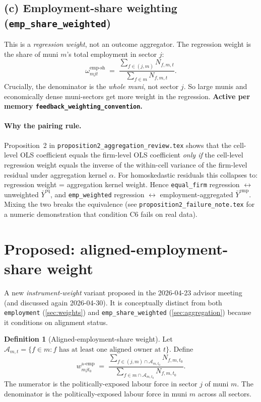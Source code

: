 \documentclass[12pt]{article}
\theoremstyle{definition}
\newtheorem{definition}{Definition}
\begin{document}
\subsection*{(c) Employment-share weighting (\texttt{emp\_share\_weighted})}
This is a \emph{regression weight}, not an outcome aggregator. The regression weight is the share of muni $m$'s total employment in sector $j$:
\[
  \omega^{\text{emp-sh}}_{m j t} \;=\; \frac{\sum_{f \in (j,m)} N_{f,m,t}}{\sum_{f \in m} N_{f,m,t}}.
\]
Crucially, the denominator is the \emph{whole muni}, not sector $j$. So large munis and economically dense muni-sectors get more weight in the regression. \textbf{Active per memory \texttt{feedback\_weighting\_convention}.}

\paragraph{Why the pairing rule.}
Proposition~2 in \texttt{proposition2\_aggregation\_review.tex} shows that the cell-level OLS coefficient equals the firm-level OLS coefficient \emph{only if} the cell-level regression weight equals the inverse of the within-cell variance of the firm-level residual under aggregation kernel $\alpha$. For homoskedastic residuals this collapses to: regression weight = aggregation kernel weight. Hence \texttt{equal\_firm} regression $\leftrightarrow$ unweighted $\bar Y^{\text{eq}}$, and \texttt{emp\_weighted} regression $\leftrightarrow$ employment-aggregated $\bar Y^{\text{emp}}$. Mixing the two breaks the equivalence (see \texttt{proposition2\_failure\_note.tex} for a numeric demonstration that condition C6 fails on real data).

\section{Proposed: aligned-employment-share weight}
\label{sec:aligned-emp-share}

A new \emph{instrument-weight} variant proposed in the 2026-04-23 advisor meeting (and discussed again 2026-04-30). It is conceptually distinct from both \texttt{employment} (\cref{sec:weights}) and \texttt{emp\_share\_weighted} (\cref{sec:aggregation}) because it conditions on alignment status.

\begin{definition}[Aligned-employment-share weight]
\label{def:aligned-emp-share}
Let $\mathcal{A}_{m,t} = \{f \in m : f \text{ has at least one aligned owner at } t\}$. Define
\begin{equation}
\label{eq:aligned-emp-share}
w^{\text{a-emp}}_{m j t_0} \;=\;
\frac{\sum_{f \in (j,m) \cap \mathcal{A}_{m,t_0}} N_{f,m,t_0}}{\sum_{f \in m \cap \mathcal{A}_{m,t_0}} N_{f,m,t_0}}.
\end{equation}
The numerator is the politically-exposed labour force in sector $j$ of muni $m$. The denominator is the politically-exposed labour force in muni $m$ across all sectors.
\end{definition}
\end{document}
